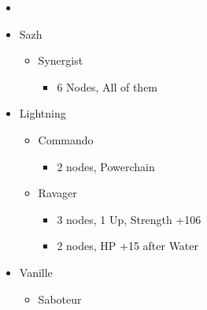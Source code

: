 \renewcommand{\first}{[1] Relentless Assault (\rav/\com/\rav)}
\renewcommand{\second}{[2] Bully (\syn/\com/\sab)}
\renewcommand{\third}{[3] Relentless Assault (\rav/\com/\rav)}
\renewcommand{\fourth}{[4] Smart Bomb (\rav/\rav/\sab)}
\renewcommand{\fifth}{[5] Tri-Disaster (\rav/\rav/\rav)}
\renewcommand{\sixth}{[6] Malevolence (\syn/\rav/\rav)}
\begin{multicols}{2}
\begin{menu}
\begin{itemize}
    \paradigm
    \begin{itemize}
        \item {}%
{\paradigmline{\rav}{\com}{\rav}}%
{\paradigmline{\syn}{\com}{\sab}}%
{\paradigmline{\rav}{\com}{(\rav)}}%
{\paradigmline[4]{\textit{\rav}}{\textit{\rav}}{\textit{\sab}}}%
{\paradigmline{\rav}{[\rav]}{\rav}}%
{\paradigmline{[\syn]}{[\rav]}{\rav}}
    \end{itemize}
    \columnbreak
    \crystarium
    \begin{itemize}
        \item Sazh
        \begin{itemize}
            \item Synergist
            \begin{itemize}
                \item 6 Nodes, All of them
            \end{itemize}
        \end{itemize}
        \item Lightning
        \begin{itemize}
            \item Commando
            \begin{itemize}
                \item 2 nodes, Powerchain
            \end{itemize}
            \item Ravager
            \begin{itemize}
                \item 3 nodes, 1 Up, Strength +106
                \item 2 nodes, HP +15 after Water
            \end{itemize}
        \end{itemize}
        \item Vanille
        \begin{itemize}
            \item Saboteur

\end{itemize}
\end{itemize}
\end{itemize}
\end{menu}
\end{multicols}
